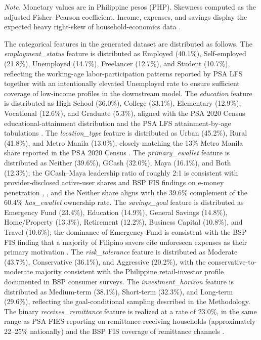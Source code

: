 \documentclass{icsthesis}
\begin{document}
\begin{mainmatter}
\begin{table}[h]
					\vspace{0.5em}
					\raggedright\scriptsize \emph{Note.} Monetary values are in Philippine pesos (PHP). Skewness computed as the adjusted Fisher--Pearson coefficient. Income, expenses, and savings display the expected heavy right-skew of household-economics data \cite{ref54}.
					\vspace{4ex}
					\end{table}

					The categorical features in the generated dataset are distributed as follows. The \emph{employment\_status} feature is distributed as Employed (40.1\%), Self-employed (21.8\%), Unemployed (14.7\%), Freelancer (12.7\%), and Student (10.7\%), reflecting the working-age labor-participation patterns reported by PSA LFS \cite{ref41} together with an intentionally elevated Unemployed rate to ensure sufficient coverage of low-income profiles in the downstream model. The \emph{education} feature is distributed as High School (36.0\%), College (33.1\%), Elementary (12.9\%), Vocational (12.6\%), and Graduate (5.3\%), aligned with the PSA 2020 Census educational-attainment distribution \cite{ref39} and the PSA LFS attainment-by-age tabulations \cite{ref41}. The \emph{location\_type} feature is distributed as Urban (45.2\%), Rural (41.8\%), and Metro Manila (13.0\%), closely matching the 13\% Metro Manila share reported in the PSA 2020 Census \cite{ref39}. The \emph{primary\_ewallet} feature is distributed as Neither (39.6\%), GCash (32.0\%), Maya (16.1\%), and Both (12.3\%); the GCash--Maya leadership ratio of roughly 2:1 is consistent with provider-disclosed active-user shares and BSP FIS findings on e-money penetration \cite{ref9}, \cite{ref35}, and the Neither share aligns with the 39.6\% complement of the 60.4\% \emph{has\_ewallet} ownership rate. The \emph{savings\_goal} feature is distributed as Emergency Fund (23.4\%), Education (14.9\%), General Savings (14.8\%), Home/Property (13.3\%), Retirement (12.2\%), Business Capital (10.8\%), and Travel (10.6\%); the dominance of Emergency Fund is consistent with the BSP FIS finding that a majority of Filipino savers cite unforeseen expenses as their primary motivation \cite{ref35}. The \emph{risk\_tolerance} feature is distributed as Moderate (43.7\%), Conservative (36.1\%), and Aggressive (20.2\%), with the conservative-to-moderate majority consistent with the Philippine retail-investor profile documented in BSP consumer surveys. The \emph{investment\_horizon} feature is distributed as Medium-term (38.1\%), Short-term (32.3\%), and Long-term (29.6\%), reflecting the goal-conditional sampling described in the Methodology. The binary \emph{receives\_remittance} feature is realized at a rate of 23.0\%, in the same range as PSA FIES reporting on remittance-receiving households (approximately 22--25\% nationally) \cite{ref40} and the BSP FIS coverage of remittance channels \cite{ref35}.


\end{mainmatter}
\end{document}
